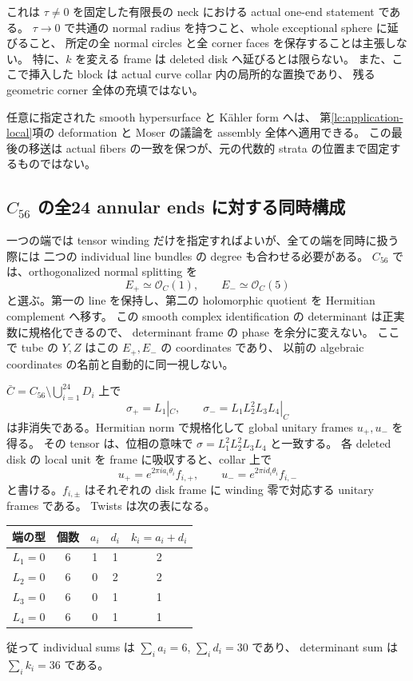 これは $\tau\ne0$ を固定した有限長の neck における actual one-end statement である。
$\tau\to0$ で共通の normal radius を持つこと、whole exceptional sphere に延びること、
所定の全 normal circles と全 corner faces を保存することは主張しない。
特に、$k$ を変える frame は deleted disk へ延びるとは限らない。
また、ここで挿入した block は actual curve collar 内の局所的な置換であり、
残る geometric corner 全体の充填ではない。

任意に指定された smooth hypersurface と K\"ahler form へは、
第\ref{lc:application-local}項の deformation と Moser の議論を assembly 全体へ適用できる。
この最後の移送は actual fibers の一致を保つが、元の代数的 strata の位置まで固定するものではない。

\subsection{$C_{56}$ の全24 annular ends に対する同時構成}

一つの端では tensor winding だけを指定すればよいが、全ての端を同時に扱う際には
二つの individual line bundles の degree も合わせる必要がある。
$C_{56}$ では、orthogonalized normal splitting を
\[
 E_+\simeq\mathcal O_C(1),\qquad E_-\simeq\mathcal O_C(5)
\]
と選ぶ。第一の line を保持し、第二の holomorphic quotient を Hermitian complement へ移す。
この smooth complex identification の determinant は正実数に規格化できるので、
determinant frame の phase を余分に変えない。
ここで tube の $Y,Z$ はこの $E_+,E_-$ の coordinates であり、
以前の algebraic coordinates の名前と自動的に同一視しない。

$\bar C=C_{56}\setminus\bigcup_{i=1}^{24}D_i$ 上で
\begin{equation}\label{ai:individual-sections}
 \sigma_+=L_1|_C,\qquad
 \sigma_-=L_1L_2^2L_3L_4|_C
\end{equation}
は非消失である。Hermitian norm で規格化して global unitary frames $u_+,u_-$ を得る。
その tensor は、位相の意味で
$\sigma=L_1^2L_2^2L_3L_4$ と一致する。
各 deleted disk の local unit を frame に吸収すると、collar 上で
\[
 u_+=e^{2\pi ia_i\theta_i}f_{i,+},\qquad
 u_-=e^{2\pi id_i\theta_i}f_{i,-}
\]
と書ける。$f_{i,\pm}$ はそれぞれの disk frame に winding 零で対応する unitary frames である。
Twists は次の表になる。
\begin{center}
\begin{tabular}{c|c|c|c|c}
端の型&個数&$a_i$&$d_i$&$k_i=a_i+d_i$\\\hline
$L_1=0$&6&1&1&2\\
$L_2=0$&6&0&2&2\\
$L_3=0$&6&0&1&1\\
$L_4=0$&6&0&1&1
\end{tabular}
\end{center}
従って individual sums は $\sum_i a_i=6$, $\sum_i d_i=30$ であり、
determinant sum は $\sum_i k_i=36$ である。

